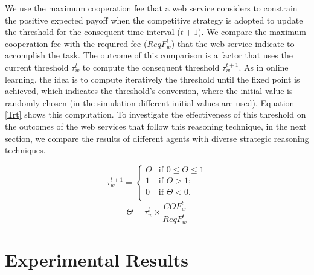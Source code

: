 \documentclass[fleqn]{singlecol-new}
\begin{document}
We use the maximum cooperation fee that a web service considers to
constrain the positive expected payoff when the competitive
strategy is adopted to update the threshold for the consequent
time interval ($t+1$). We compare the maximum cooperation fee with
the required fee ($ReqF_w^t$) that the web service indicate to
accomplish the task. The outcome of this comparison is a factor
that uses the current threshold $\tau_w^t$ to compute the
consequent threshold $\tau_w^{t+1}$. As in online learning, the
idea is to compute iteratively the threshold until the fixed point
is achieved, which indicates the threshold's conversion, where the
initial value is randomly chosen (in the simulation different
initial values are used). Equation
\ref{Trt} shows this computation. %
To investigate the effectiveness of this threshold on the outcomes
of the web services that follow this reasoning technique, in the
next section, we compare the results of different agents with
diverse strategic reasoning techniques.

\begin{equation}\label{Trt}
\tau_w^{t+1}=\begin{cases}
\Theta & \text{if $0 \leq \Theta \leq 1$}\\
1 & \text{if $\Theta > 1$;}\\
0 & \text{if $\Theta < 0$.}\\
\end{cases}
\end{equation}
\begin{equation*}
\Theta =\tau_w^t \times \frac{COF_w^t}{ReqF_w^t}
\end{equation*}



\section{Experimental Results}\label{Experimental Results}
\end{document}
